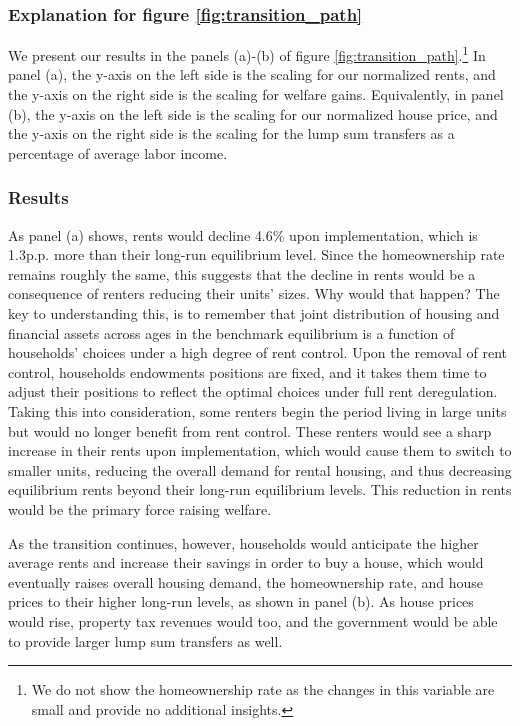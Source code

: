 \documentclass[parskip=full]{article}
\begin{document}
\subsubsection{Explanation for figure \ref{fig:transition_path}} We present our results in the panels (a)-(b) of figure \ref{fig:transition_path}.\footnote{We do not show the homeownership rate as the changes in this variable are small and provide no additional insights.} In panel (a), the y-axis on the left side is the scaling for our normalized rents, and the y-axis on the right side is the scaling for welfare gains. Equivalently, in panel (b), the y-axis on the left side is the scaling for our normalized house price, and the y-axis on the right side is the scaling for the lump sum transfers as a percentage of average labor income.

\subsubsection{Results} As panel (a) shows, rents would decline 4.6\% upon implementation, which is 1.3p.p. more than their long-run equilibrium level. Since the homeownership rate remains roughly the same, this suggests that the decline in rents would be a consequence of renters reducing their units' sizes. Why would that happen? The key to understanding this, is to remember that joint distribution of housing and financial assets across ages in the benchmark equilibrium is a function of households' choices under a high degree of rent control. Upon the removal of rent control, households endowments positions are fixed, and it takes them time to adjust their positions to reflect the optimal choices under full rent deregulation. Taking this into consideration, some renters begin the period living in large units but would no longer benefit from rent control. These renters would see a sharp increase in their rents upon implementation, which would cause them to switch to smaller units, reducing the overall demand for rental housing, and thus decreasing equilibrium rents beyond their long-run equilibrium levels. This reduction in rents would be the primary force raising welfare. 

As the transition continues, however, households would anticipate the higher average rents and increase their savings in order to buy a house, which would eventually raises overall housing demand, the homeownership rate, and house prices to their higher long-run levels, as shown in panel (b). As house prices would rise, property tax revenues would too, and the government would be able to provide larger lump sum transfers as well.
\end{document}
